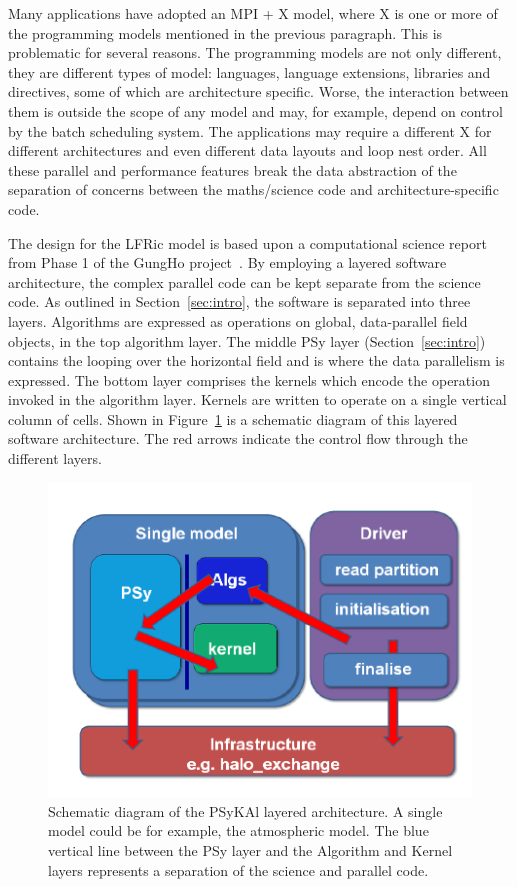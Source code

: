 \documentclass[review,times]{elsarticle}
\begin{document}
Many applications have adopted an MPI + X model, where X is one or
more of the programming models mentioned in the previous paragraph. This
is problematic for several reasons. The programming models are not
only different, they are different types of model: languages, language
extensions, libraries and directives, some of which are architecture
specific. Worse, the interaction between them is outside the scope of
any model and may, for example, depend on control by the batch scheduling
system. The applications may require a different X for
different architectures and even different data layouts and
loop nest order. All these parallel and performance features
break the data abstraction of the separation of concerns between the
maths/science code and architecture-specific code.

The design for the LFRic model is based upon a computational science
report from Phase 1 of the GungHo project~\cite{GHP1_CSR}. By
employing a layered software architecture, the complex parallel code
can be kept separate from the science code. As outlined in 
Section~\ref{sec:intro}, the software is separated into three layers.
Algorithms are expressed as operations on global, data-parallel field objects,
in the top algorithm layer. The middle PSy layer (Section~\ref{sec:intro}) 
contains the looping over the horizontal field and is where the data parallelism is expressed. 
The bottom layer comprises the kernels which encode the operation invoked in the
algorithm layer. Kernels are written to operate on a single vertical column of cells. 
Shown in Figure~\ref{fig:psykal} is a schematic diagram of this
layered software architecture. The red arrows indicate the control flow
through the different layers.

\begin{figure}
\centering\includegraphics[width=0.8\linewidth]{Fig3_PSyKAl.pdf}
\caption{\label{fig:psykal} Schematic diagram of the PSyKAl layered
  architecture. A single model could be for example, the atmospheric
  model. The blue vertical line between the PSy layer and the
  Algorithm and Kernel layers represents a separation of the science
  and parallel code.}
\end{figure}
\end{document}
